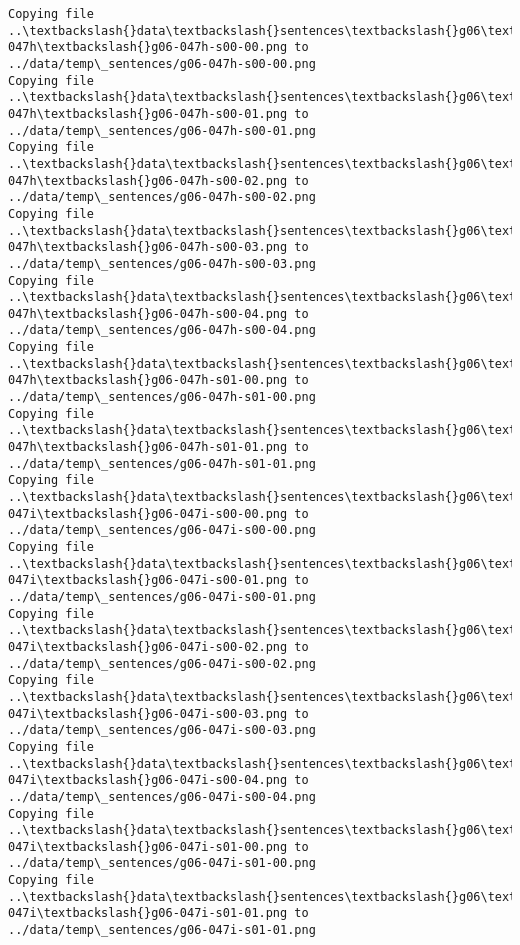 \documentclass[11pt]{article}
\begin{document}
\begin{Verbatim}[commandchars=\\\{\}]
Copying file ..\textbackslash{}data\textbackslash{}sentences\textbackslash{}g06\textbackslash{}g06-047h\textbackslash{}g06-047h-s00-00.png to
../data/temp\_sentences/g06-047h-s00-00.png
Copying file ..\textbackslash{}data\textbackslash{}sentences\textbackslash{}g06\textbackslash{}g06-047h\textbackslash{}g06-047h-s00-01.png to
../data/temp\_sentences/g06-047h-s00-01.png
Copying file ..\textbackslash{}data\textbackslash{}sentences\textbackslash{}g06\textbackslash{}g06-047h\textbackslash{}g06-047h-s00-02.png to
../data/temp\_sentences/g06-047h-s00-02.png
Copying file ..\textbackslash{}data\textbackslash{}sentences\textbackslash{}g06\textbackslash{}g06-047h\textbackslash{}g06-047h-s00-03.png to
../data/temp\_sentences/g06-047h-s00-03.png
Copying file ..\textbackslash{}data\textbackslash{}sentences\textbackslash{}g06\textbackslash{}g06-047h\textbackslash{}g06-047h-s00-04.png to
../data/temp\_sentences/g06-047h-s00-04.png
Copying file ..\textbackslash{}data\textbackslash{}sentences\textbackslash{}g06\textbackslash{}g06-047h\textbackslash{}g06-047h-s01-00.png to
../data/temp\_sentences/g06-047h-s01-00.png
Copying file ..\textbackslash{}data\textbackslash{}sentences\textbackslash{}g06\textbackslash{}g06-047h\textbackslash{}g06-047h-s01-01.png to
../data/temp\_sentences/g06-047h-s01-01.png
Copying file ..\textbackslash{}data\textbackslash{}sentences\textbackslash{}g06\textbackslash{}g06-047i\textbackslash{}g06-047i-s00-00.png to
../data/temp\_sentences/g06-047i-s00-00.png
Copying file ..\textbackslash{}data\textbackslash{}sentences\textbackslash{}g06\textbackslash{}g06-047i\textbackslash{}g06-047i-s00-01.png to
../data/temp\_sentences/g06-047i-s00-01.png
Copying file ..\textbackslash{}data\textbackslash{}sentences\textbackslash{}g06\textbackslash{}g06-047i\textbackslash{}g06-047i-s00-02.png to
../data/temp\_sentences/g06-047i-s00-02.png
Copying file ..\textbackslash{}data\textbackslash{}sentences\textbackslash{}g06\textbackslash{}g06-047i\textbackslash{}g06-047i-s00-03.png to
../data/temp\_sentences/g06-047i-s00-03.png
Copying file ..\textbackslash{}data\textbackslash{}sentences\textbackslash{}g06\textbackslash{}g06-047i\textbackslash{}g06-047i-s00-04.png to
../data/temp\_sentences/g06-047i-s00-04.png
Copying file ..\textbackslash{}data\textbackslash{}sentences\textbackslash{}g06\textbackslash{}g06-047i\textbackslash{}g06-047i-s01-00.png to
../data/temp\_sentences/g06-047i-s01-00.png
Copying file ..\textbackslash{}data\textbackslash{}sentences\textbackslash{}g06\textbackslash{}g06-047i\textbackslash{}g06-047i-s01-01.png to
../data/temp\_sentences/g06-047i-s01-01.png

\end{Verbatim}
\end{document}
